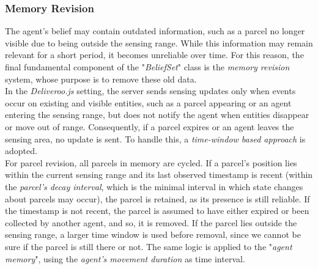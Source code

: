        \subsubsection{Memory Revision}\label{memoryRevision}
            The agent's belief may contain outdated information, such as a parcel no longer visible due to being outside the sensing range. While this information may remain relevant for a short period, it becomes unreliable over time. For this reason, the final fundamental component of the "\textit{BeliefSet}" class is the \textit{memory revision} system, whose purpose is to remove these old data.
            \medskip\\
            In the \textit{Deliveroo.js} setting, the server sends sensing updates only when events occur on existing and visible entities, such as a parcel appearing or an agent entering the sensing range, but does not notify the agent when entities disappear or move out of range. Consequently, if a parcel expires or an agent leaves the sensing area, no update is sent. To handle this, a \textit{time-window based approach} is adopted.
            \medskip\\
            For parcel revision, all parcels in memory are cycled. If a parcel's position lies within the current sensing range and its last observed timestamp is recent (within the \textit{parcel's decay interval}, which is the minimal interval in which state changes about parcels may occur), the parcel is retained, as its presence is still reliable. If the timestamp is not recent, the parcel is assumed to have either expired or been collected by another agent, and so, it is removed. If the parcel lies outside the sensing range, a larger time window is used before removal, since we cannot be sure if the parcel is still there or not. The same logic is applied to the "\textit{agent memory}", using the \textit{agent's movement duration} as time interval.

